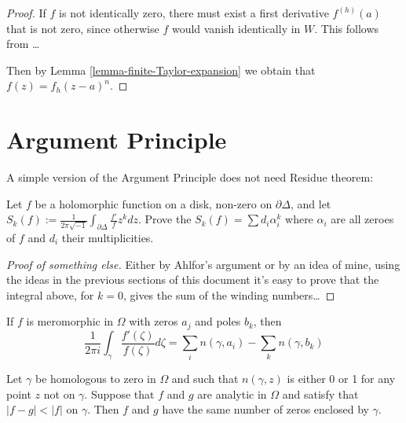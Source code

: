 \begin{proof}
If $f$ is not identically zero, there must exist a first derivative $f^{
(h)}(a)$ that is not zero, since otherwise $f$ would vanish identically in $W$.
This follows from … 

Then by Lemma \ref{lemma-finite-Taylor-expansion} we obtain that
$f(z)=f_h(z-a)^n$.
\end{proof}

\section{Argument Principle}
\label{section-argument-principle}

A simple version of the Argument Principle does not need Residue theorem:

\begin{exercise}
\label{exercise-argument-principle}
Let $f$ be a holomorphic function on a disk, non-zero on $\partial \Delta$, and
let $S_k(f):=\frac{1}{2\pi\sqrt{-1}}\int_{\partial\Delta}\frac{f'}{f}z^kdz$.
Prove the $S_k(f)=\sum d_i\alpha_i^k$ where $\alpha_i$ are all zeroes of $f$ and
$d_i$ their multiplicities.
\end{exercise}

\begin{proof}[Proof of something else]
Either by Ahlfor's argument or by an idea of mine, using the ideas in the
previous sections of this document it's easy to prove that the integral above,
for $k=0$, gives the sum of the winding numbers…
\end{proof}


\begin{theorem}
\label{theorem-argument-principle-and-Rouche-theorem}
\begin{reference}
\cite[Chapter 5, Theorem 18]{ahl}
\end{reference}
If $f$ is meromorphic in $\Omega$ with zeros $a_j$ and poles $b_k$, then
\begin{equation}
\label{equation-argument-principle}
\frac{1}{2\pi i}\int_\gamma\frac{f'(\zeta)}{f(\zeta)}d\zeta
=\sum_{i}n(\gamma,a_i)-\sum_{k}n(\gamma,b_k)
\end{equation}
\end{theorem}

\begin{lemma}
\label{lemma-Rouche-theorem}
\begin{reference}
\cite[Chapter 5, Corollary, p. 153]{ahl}
\end{reference}
Let $\gamma$ be homologous to zero in $\Omega$ and such that $n(\gamma,z)$ is
either 0 or 1 for any point $z$ not on $\gamma$. Suppose that $f$ and $g$ are
analytic in $\Omega$ and satisfy that $|f-g|<|f|$ on $\gamma$. Then $f$ and $g$
have the same number of zeros enclosed by $\gamma$.
\end{lemma}

